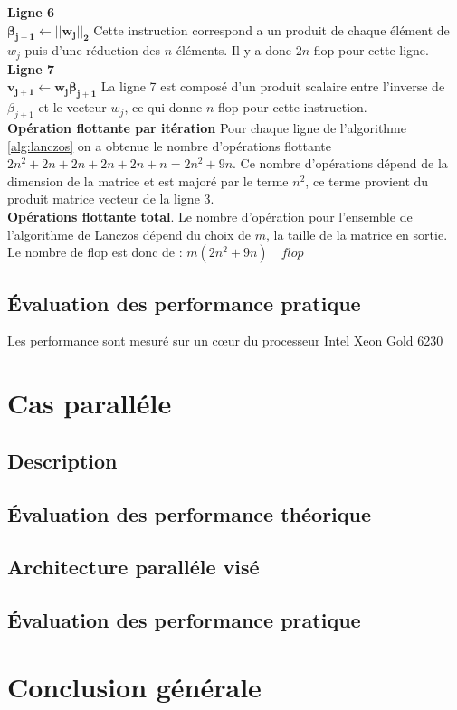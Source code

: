 \documentclass[11pt,french]{article}
\begin{document}
	\noindent\textbf{Ligne  6}\\
	$\boldsymbol {\beta_{j+1} \gets || w_j||_2}$
	Cette instruction correspond a un produit de chaque élément de $w_j$ puis d'une réduction des $n$ éléments. Il y a donc $2n$ flop pour cette ligne.  \\
	
	\noindent\textbf{Ligne  7}\\
	$\boldsymbol {v_{j+1} \gets w_j \beta_{j+1}}$
	La ligne 7 est composé d'un produit scalaire entre l’inverse de $\beta_{j+1}$ et le vecteur $w_j$, ce qui donne $n$ flop pour cette instruction. \\ 
	
	\noindent\textbf{Opération flottante par itération}
	Pour chaque ligne de l'algorithme \ref{alg:lanczos} on a obtenue le nombre d’opérations flottante  $2n^2 + 2n + 2n +2n +2n +n = 2n^2 + 9n$. Ce nombre d’opérations dépend de la dimension de la matrice et est majoré par le terme $n^2$, ce terme provient du produit matrice vecteur de la ligne 3. \\
	
	\noindent \textbf{Opérations flottante total}. Le nombre d’opération pour l'ensemble de l'algorithme de Lanczos dépend du choix de $m$, la taille de la matrice en sortie.\\ 
	Le nombre de flop est donc de : $  m(2n^2 + 9n) \quad flop $
	
	\subsection{Évaluation des performance pratique}
	Les performance sont mesuré sur un cœur du processeur Intel Xeon Gold 6230
	
	\section{Cas paralléle}
	
	\subsection{Description}
	
	\subsection{Évaluation des performance théorique}
	
	\subsection{Architecture paralléle visé}
	
	\subsection{Évaluation des performance pratique}
	
	\section{Conclusion générale}
	
\end{document}
